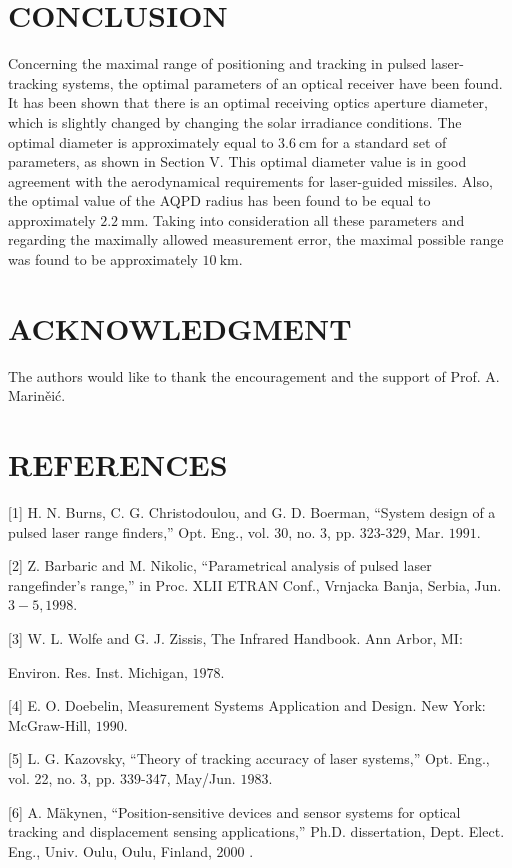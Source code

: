 \documentclass[10pt]{article}
\begin{document}
\section{CONCLUSION}
Concerning the maximal range of positioning and tracking in pulsed laser-tracking systems, the optimal parameters of an optical receiver have been found. It has been shown that there is an optimal receiving optics aperture diameter, which is slightly changed by changing the solar irradiance conditions. The optimal diameter is approximately equal to \(3.6 \mathrm{~cm}\) for a standard set of parameters, as shown in Section \(\mathrm{V}\). This optimal diameter value is in good agreement with the aerodynamical requirements for laser-guided missiles. Also, the optimal value of the AQPD radius has been found to be equal to approximately \(2.2 \mathrm{~mm}\). Taking into consideration all these parameters and regarding the maximally allowed measurement error, the maximal possible range was found to be approximately \(10 \mathrm{~km}\).

\section{ACKNOWLEDGMENT}
The authors would like to thank the encouragement and the support of Prof. A. Mariněić.

\section{REFERENCES}
[1] H. N. Burns, C. G. Christodoulou, and G. D. Boerman, “System design of a pulsed laser range finders,” Opt. Eng., vol. 30, no. 3, pp. 323-329, Mar. \(1991 .\)

[2] Z. Barbaric and M. Nikolic, “Parametrical analysis of pulsed laser rangefinder’s range,” in Proc. XLII ETRAN Conf., Vrnjacka Banja, Serbia, Jun. \(3-5,1998\).

[3] W. L. Wolfe and G. J. Zissis, The Infrared Handbook. Ann Arbor, MI:

Environ. Res. Inst. Michigan, \(1978 .\)

[4] E. O. Doebelin, Measurement Systems Application and Design. New York: McGraw-Hill, \(1990 .\)

[5] L. G. Kazovsky, “Theory of tracking accuracy of laser systems,” Opt. Eng., vol. 22, no. 3, pp. 339-347, May/Jun. \(1983 .\)

[6] A. Mäkynen, “Position-sensitive devices and sensor systems for optical tracking and displacement sensing applications,” Ph.D. dissertation, Dept. Elect. Eng., Univ. Oulu, Oulu, Finland, 2000 .
\end{document}
